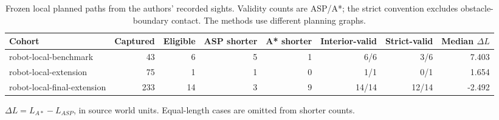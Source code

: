 \begin{table}[t]
\centering
\caption{Frozen local planned paths from the authors' recorded sights. Validity counts are ASP/A*; the strict convention excludes obstacle-boundary contact. The methods use different planning graphs.}
\label{tab:robot-local-final}
\begin{tabular}{lrrrrrrr}
\hline
Cohort & Captured & Eligible & ASP shorter & A* shorter & Interior-valid & Strict-valid & Median $\Delta L$ \\
\hline
robot-local-benchmark & 43 & 6 & 5 & 1 & 6/6 & 3/6 & 7.403 \\
robot-local-extension & 75 & 1 & 1 & 0 & 1/1 & 0/1 & 1.654 \\
robot-local-final-extension & 233 & 14 & 3 & 9 & 14/14 & 12/14 & -2.492 \\
\hline
\end{tabular}
\footnotesize{$\Delta L=L_{A*}-L_{ASP}$, in source world units. Equal-length cases are omitted from shorter counts.}
\end{table}
